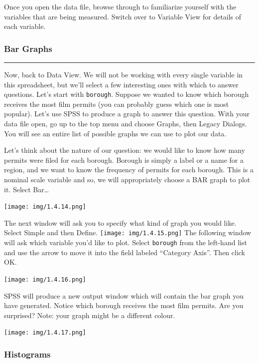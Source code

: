 \documentclass[]{book}
\begin{document}
Once you open the data file, browse through to familiarize yourself with
the variables that are being measured. Switch over to Variable View for
details of each variable.

\subsubsection{Bar Graphs}\label{bar-graphs}

\begin{center}\rule{0.5\linewidth}{0.5pt}\end{center}

Now, back to Data View. We will not be working with every single
variable in this spreadsheet, but we'll select a few interesting ones
with which to answer questions. Let's start with \texttt{borough}.
Suppose we wanted to know which borough receives the most film permits
(you can probably guess which one is most popular). Let's use SPSS to
produce a graph to answer this question. With your data file open, go up
to the top menu and choose {Graphs}, then {Legacy Dialogs}. You will see
an entire list of possible graphs we can use to plot our data.

Let's think about the nature of our question: we would like to know how
many permits were filed for each borough. Borough is simply a label or a
name for a region, and we want to know the frequency of permits for each
borough. This is a nominal scale variable and so, we will appropriately
choose a BAR graph to plot it. Select {Bar\ldots{}}

\texttt{[image: img/1.4.14.png]}

The next window will ask you to specify what kind of graph you would
like. Select {Simple} and then {Define}.
\texttt{[image: img/1.4.15.png]} The following window will ask which
variable you'd like to plot. Select \texttt{borough} from the left-hand
list and use the arrow to move it into the field labeled ``Category
Axis''. Then click {OK}.

\texttt{[image: img/1.4.16.png]}

SPSS will produce a new output window which will contain the bar graph
you have generated. Notice which borough receives the most film permits.
Are you surprised? Note: your graph might be a different colour.

\texttt{[image: img/1.4.17.png]}

\subsubsection{Histograms}\label{histograms}
\end{document}
